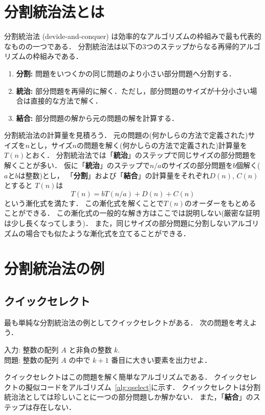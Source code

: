 \documentclass[a4paper,twoside,onecolumn,openany,article]{memoir}
\theoremstyle{remark}
\begin{document}
\section{分割統治法とは}
分割統治法 (devide-and-conquer) は効率的なアルゴリズムの枠組みで最も代表的なものの一つである．
分割統治法は以下の3つのステップからなる再帰的アルゴリズムの枠組みである．
\begin{enumerate}
\item \textbf{分割:} 問題をいつくかの同じ問題のより小さい部分問題へ分割する．
\item \textbf{統治:} 部分問題を再帰的に解く．ただし，部分問題のサイズが十分小さい場合は直接的な方法で解く．
\item \textbf{結合:} 部分問題の解から元の問題の解を計算する．
\end{enumerate}
分割統治法の計算量を見積ろう．
元の問題の(何かしらの方法で定義された)サイズを$n$とし，サイズ$n$の問題を解く(何かしらの方法で定義された)計算量を$T(n)$とおく．
分割統治法では「\textbf{統治}」のステップで同じサイズの部分問題を解くことが多い．
仮に「\textbf{統治}」のステップで$n/a$のサイズの部分問題を$b$個解く($a$と$b$は整数)とし，
「\textbf{分割}」および「\textbf{結合}」の計算量をそれぞれ$D(n)$, $C(n)$ とすると
$T(n)$は
\begin{equation*}
T(n) = bT(n/a) + D(n) + C(n)
\end{equation*}
という漸化式を満たす．
この漸化式を解くことで$T(n)$のオーダーをもとめることができる．
この漸化式の一般的な解き方はここでは説明しない(厳密な証明は少し長くなってしまう)．
また，同じサイズの部分問題に分割しないアルゴリズムの場合でも似たような漸化式を立てることができる．

\section{分割統治法の例}
\subsection{クイックセレクト}
最も単純な分割統治法の例としてクイックセレクトがある．
次の問題を考えよう．

\vspace{1em}
\noindent
入力: 整数の配列 $A$ と非負の整数 $k$.\\
問題: 整数の配列 $A$ の中で $k+1$ 番目に大きい要素を出力せよ．

\vspace{1em}
\noindent
クイックセレクトはこの問題を解く簡単なアルゴリズムである．
クイックセレクトの擬似コードをアルゴリズム~\ref{alg:qselect}に示す．
クイックセレクトは分割統治法としては珍しいことに一つの部分問題しか解かない．
また，「\textbf{結合}」のステップは存在しない．
\end{document}
